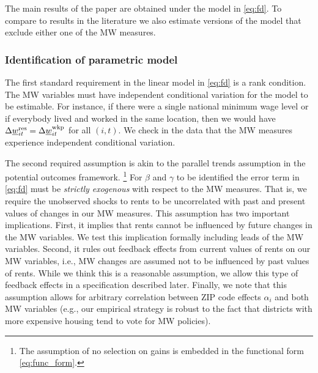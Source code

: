 The main results of the paper are obtained under the model in \eqref{eq:fd}. 
To compare to results in the literature we also estimate versions of the 
model that exclude either one of the MW measures.

\subsubsection*{Identification of parametric model}

The first standard requirement in the linear model in \eqref{eq:fd} is a 
rank condition.
The MW variables must have independent conditional variation for the model
to be estimable.
For instance, if there were a single national minimum wage level or if everybody 
lived and worked in the same location, then we would have
$\Delta \underline{w}^{\text{res}}_{it} = \Delta \underline{w}^{\text{wkp}}_{it}$ for all $(i,t)$.
We check in the data that the MW measures experience independent conditional 
variation.

The second required assumption is akin to the parallel trends assumption in 
the potential outcomes framework.%
\footnote{The assumption of no selection on gains is embedded in the functional
form \eqref{eq:func_form}.}
For $\beta$ and $\gamma$ to be identified the error term in \eqref{eq:fd} must 
be \textit{strictly exogenous} with respect to the MW measures. 
That is, we require the unobserved shocks to rents to be uncorrelated with 
past and present values of changes in our MW measures.
This assumption has two important implications.
First,
it implies that rents cannot be influenced by future changes in the MW variables.
We test this implication formally including leads of the MW variables.
Second,
it rules out feedback effects from current values of rents on our MW variables, 
i.e., MW changes are assumed not to be influenced by past values of rents.
While we think this is a reasonable assumption, we allow this type of feedback 
effects in a specification described later.
Finally, we note that this assumption allows for arbitrary correlation between 
ZIP code effects $\alpha_i$ and both MW variables 
(e.g., our empirical strategy is robust to the fact that districts with more
expensive housing tend to vote for MW policies).

